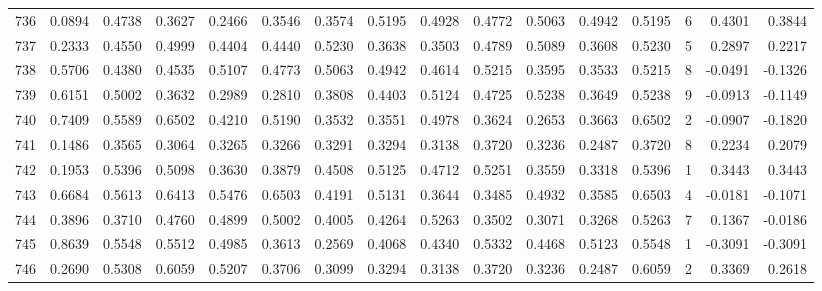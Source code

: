 \begin{tabular}{lrrrrrrrrrrrrrrr}
736 &      0.0894 &  0.4738 &  0.3627 &  0.2466 &  0.3546 &  0.3574 &  0.5195 &  0.4928 &  0.4772 &  0.5063 &   0.4942 &     0.5195 &      6 &                    0.4301 &                     0.3844 \\
737 &      0.2333 &  0.4550 &  0.4999 &  0.4404 &  0.4440 &  0.5230 &  0.3638 &  0.3503 &  0.4789 &  0.5089 &   0.3608 &     0.5230 &      5 &                    0.2897 &                     0.2217 \\
738 &      0.5706 &  0.4380 &  0.4535 &  0.5107 &  0.4773 &  0.5063 &  0.4942 &  0.4614 &  0.5215 &  0.3595 &   0.3533 &     0.5215 &      8 &                   -0.0491 &                    -0.1326 \\
739 &      0.6151 &  0.5002 &  0.3632 &  0.2989 &  0.2810 &  0.3808 &  0.4403 &  0.5124 &  0.4725 &  0.5238 &   0.3649 &     0.5238 &      9 &                   -0.0913 &                    -0.1149 \\
740 &      0.7409 &  0.5589 &  0.6502 &  0.4210 &  0.5190 &  0.3532 &  0.3551 &  0.4978 &  0.3624 &  0.2653 &   0.3663 &     0.6502 &      2 &                   -0.0907 &                    -0.1820 \\
741 &      0.1486 &  0.3565 &  0.3064 &  0.3265 &  0.3266 &  0.3291 &  0.3294 &  0.3138 &  0.3720 &  0.3236 &   0.2487 &     0.3720 &      8 &                    0.2234 &                     0.2079 \\
742 &      0.1953 &  0.5396 &  0.5098 &  0.3630 &  0.3879 &  0.4508 &  0.5125 &  0.4712 &  0.5251 &  0.3559 &   0.3318 &     0.5396 &      1 &                    0.3443 &                     0.3443 \\
743 &      0.6684 &  0.5613 &  0.6413 &  0.5476 &  0.6503 &  0.4191 &  0.5131 &  0.3644 &  0.3485 &  0.4932 &   0.3585 &     0.6503 &      4 &                   -0.0181 &                    -0.1071 \\
744 &      0.3896 &  0.3710 &  0.4760 &  0.4899 &  0.5002 &  0.4005 &  0.4264 &  0.5263 &  0.3502 &  0.3071 &   0.3268 &     0.5263 &      7 &                    0.1367 &                    -0.0186 \\
745 &      0.8639 &  0.5548 &  0.5512 &  0.4985 &  0.3613 &  0.2569 &  0.4068 &  0.4340 &  0.5332 &  0.4468 &   0.5123 &     0.5548 &      1 &                   -0.3091 &                    -0.3091 \\
746 &      0.2690 &  0.5308 &  0.6059 &  0.5207 &  0.3706 &  0.3099 &  0.3294 &  0.3138 &  0.3720 &  0.3236 &   0.2487 &     0.6059 &      2 &                    0.3369 &                     0.2618 \\

\end{tabular}
